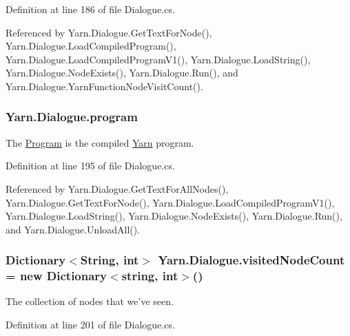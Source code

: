 Definition at line 186 of file Dialogue.\-cs.



Referenced by Yarn.\-Dialogue.\-Get\-Text\-For\-Node(), Yarn.\-Dialogue.\-Load\-Compiled\-Program(), Yarn.\-Dialogue.\-Load\-Compiled\-Program\-V1(), Yarn.\-Dialogue.\-Load\-String(), Yarn.\-Dialogue.\-Node\-Exists(), Yarn.\-Dialogue.\-Run(), and Yarn.\-Dialogue.\-Yarn\-Function\-Node\-Visit\-Count().

\hypertarget{a00082_a0a1cca92325f430425d784d416cb5c2b}{
\subsubsection[{program}]{ Yarn.\-Dialogue.\-program\hspace{0.3cm}{\ttfamily [package]}}}\label{a00082_a0a1cca92325f430425d784d416cb5c2b}


The \hyperlink{a00142}{Program} is the compiled \hyperlink{a00041}{Yarn} program. 



Definition at line 195 of file Dialogue.\-cs.



Referenced by Yarn.\-Dialogue.\-Get\-Text\-For\-All\-Nodes(), Yarn.\-Dialogue.\-Get\-Text\-For\-Node(), Yarn.\-Dialogue.\-Load\-Compiled\-Program\-V1(), Yarn.\-Dialogue.\-Load\-String(), Yarn.\-Dialogue.\-Node\-Exists(), Yarn.\-Dialogue.\-Run(), and Yarn.\-Dialogue.\-Unload\-All().

\hypertarget{a00082_aae9e64354066a1e2fa130629959d772b}{
\subsubsection[{visited\-Node\-Count}]{\setlength{\rightskip}{0pt plus 5cm}Dictionary$<${\bf String}, int$>$ Yarn.\-Dialogue.\-visited\-Node\-Count = new Dictionary$<$string, int$>$()}}\label{a00082_aae9e64354066a1e2fa130629959d772b}


The collection of nodes that we've seen. 



Definition at line 201 of file Dialogue.\-cs.



